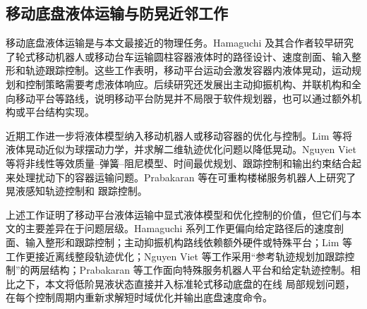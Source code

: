 \subsection{移动底盘液体运输与防晃近邻工作}

移动底盘液体运输是与本文最接近的物理任务。Hamaguchi 及其合作者较早研究了轮式移动机器人或移动台车运输圆柱容器液体时的路径设计、速度剖面、输入整形和轨迹跟踪控制\cite{B04_Hamaguchi2002,B03_Hamaguchi2004,B02_Hamaguchi2005}。这些工作表明，移动平台运动会激发容器内液体晃动，运动规划和控制策略需要考虑液体响应。后续研究还发展出主动抑振机构、并联机构和全向移动平台等路线\cite{B05_Hamaguchi2019,B06_Hamaguchi2018,B07_Nguyen2024,B08_Yuan2020}，说明移动平台防晃并不局限于软件规划器，也可以通过额外机构或平台结构实现。

近期工作进一步将液体模型纳入移动机器人或移动容器的优化与控制。Lim 等将液体晃动近似为球摆动力学，并求解二维轨迹优化问题以降低晃动\cite{B01_Lim2024}。Nguyen Viet 等将非线性等效质量--弹簧--阻尼模型、时间最优规划、跟踪控制和输出约束结合起来处理扰动下的容器运输问题\cite{B11_Viet2025}。Prabakaran 等在可重构楼梯服务机器人上研究了晃液感知轨迹控制和 \MPC{} 跟踪控制\cite{B12_Prabakaran2026}。

上述工作证明了移动平台液体运输中显式液体模型和优化控制的价值，但它们与本文的主要差异在于问题层级。Hamaguchi 系列工作更偏向给定路径后的速度剖面、输入整形和跟踪控制；主动抑振机构路线依赖额外硬件或特殊平台；Lim 等工作更接近离线整段轨迹优化；Nguyen Viet 等工作采用“参考轨迹规划加跟踪控制”的两层结构；Prabakaran 等工作面向特殊服务机器人平台和给定轨迹控制。相比之下，本文将低阶晃液状态直接并入标准轮式移动底盘的在线 \MPCC{} 局部规划问题，在每个控制周期内重新求解短时域优化并输出底盘速度命令。

